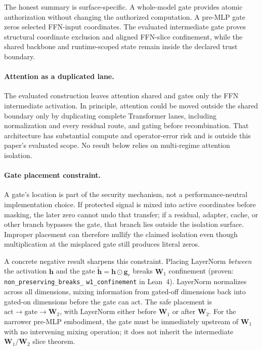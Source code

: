 \documentclass[11pt,a4paper]{article}
\newcommand{\bh}{\mathbf{h}}
\newcommand{\bW}{\mathbf{W}}
\newcommand{\bg}{\mathbf{g}}
\begin{document}
The honest summary is surface-specific.  A whole-model gate provides
atomic authorization without changing the authorized computation.  A
pre-MLP gate zeros selected FFN-input coordinates.  The evaluated
intermediate gate proves structural coordinate exclusion and aligned
FFN-slice confinement, while the shared backbone and runtime-scoped
state remain inside the declared trust boundary.

\paragraph{Attention as a duplicated lane.}
The evaluated construction leaves attention shared and gates only
the FFN intermediate activation.  In principle, attention could be
moved outside the shared boundary only by duplicating complete
Transformer lanes, including normalization and every residual route,
and gating before recombination.  That architecture has substantial
compute and operator-error risk and is outside this paper's evaluated
scope.  No result below relies on multi-regime attention isolation.

\paragraph{Gate placement constraint.}
A gate's location is part of the security mechanism, not a
performance-neutral implementation choice.  If protected signal is
mixed into active coordinates before masking, the later zero cannot
undo that transfer; if a residual, adapter, cache, or other branch
bypasses the gate, that branch lies outside the isolation surface.
Improper placement can therefore nullify the claimed isolation even
though multiplication at the misplaced gate still produces literal
zeros.

A concrete negative result sharpens this constraint.  Placing LayerNorm
\emph{between} the activation $\bh$ and the gate
$\tilde{\bh} = \bh \odot \bg_r$ breaks $\bW_1$ confinement
(proven: \texttt{non\_preserving\_breaks\_}\allowbreak
\texttt{w1\_confinement} in
Lean~4).  LayerNorm normalizes across all dimensions, mixing
information from gated-off dimensions back into gated-on
dimensions before the gate can act.  The safe placement is
$\text{act} \to \text{gate} \to \bW_2$, with LayerNorm either
before $\bW_1$ or after $\bW_2$.  For the narrower pre-MLP
embodiment, the gate must be immediately upstream of $\bW_1$ with no
intervening mixing operation; it does not inherit the intermediate
$\bW_1/\bW_2$ slice theorem.
\end{document}
